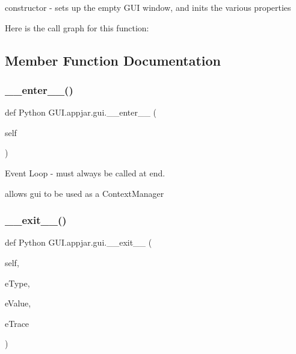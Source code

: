 \begin{DoxyVerb}constructor - sets up the empty GUI window, and inits the various properties \end{DoxyVerb}
 Here is the call graph for this function\+:


\subsection{Member Function Documentation}
\mbox{\label{class_python_01_g_u_i_1_1appjar_1_1gui_a45970d4455a57ab7d4dc44f26cb90502}} 
\subsubsection{\texorpdfstring{\+\_\+\+\_\+enter\+\_\+\+\_\+()}{\_\_enter\_\_()}}
{\footnotesize\ttfamily def Python G\+U\+I.\+appjar.\+gui.\+\_\+\+\_\+enter\+\_\+\+\_\+ (\begin{DoxyParamCaption}\item[{}]{self }\end{DoxyParamCaption})}



Event Loop -\/ must always be called at end. 

\begin{DoxyVerb}allows gui to be used as a ContextManager \end{DoxyVerb}
 \mbox{\label{class_python_01_g_u_i_1_1appjar_1_1gui_a73cce8684dfecccd7dc3c68abd7cc8ae}} 
\subsubsection{\texorpdfstring{\+\_\+\+\_\+exit\+\_\+\+\_\+()}{\_\_exit\_\_()}}
{\footnotesize\ttfamily def Python G\+U\+I.\+appjar.\+gui.\+\_\+\+\_\+exit\+\_\+\+\_\+ (\begin{DoxyParamCaption}\item[{}]{self,  }\item[{}]{e\+Type,  }\item[{}]{e\+Value,  }\item[{}]{e\+Trace }\end{DoxyParamCaption})}


